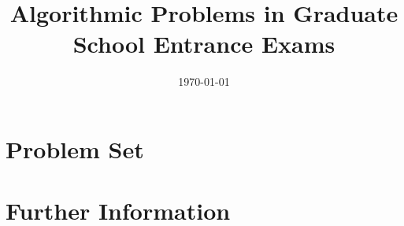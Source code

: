 \documentclass{book}[12pt]
\title{Algorithmic Problems in Graduate School Entrance Exams}
\date{\today}
\theoremstyle{remark}
\begin{document}
%
\tableofcontents
\listoftables
\part{Problem Set}






\part{Further Information}

\end{document}
